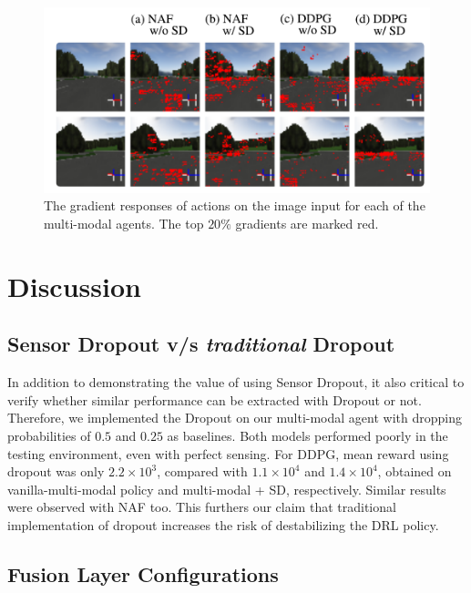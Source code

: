 \documentclass[../thesis.tex]{subfiles}
\begin{document}
\begin{figure}[t]
\begin{center}
\centerline{\includegraphics[width=\columnwidth]{./MultimodalDRL/fig/grad_image.png}}
\caption{The gradient responses of actions on the image input for each of the multi-modal agents. The top $20\%$ gradients are marked red.}
\label{fig:grad_exp_img}
\end{center}
\end{figure} 


\section{Discussion}
\subsection{Sensor Dropout v/s \emph{traditional} Dropout}
In addition to demonstrating the value of using Sensor Dropout, it also critical to verify whether similar performance can be extracted with Dropout or not. Therefore, we implemented the Dropout on our multi-modal agent with dropping probabilities of $0.5$ and $0.25$ as baselines. Both models performed poorly in the testing environment, even with perfect sensing. For DDPG, mean reward using dropout was only $2.2\times 10^3$, compared with $1.1\times 10^4$ and $1.4\times 10^4$, obtained on vanilla-multi-modal policy and multi-modal + SD, respectively. Similar results were observed with NAF too. This furthers our claim that traditional implementation of dropout increases the risk of destabilizing the DRL policy.

\subsection{Fusion Layer Configurations} \label{sec:SD-config}
\end{document}
